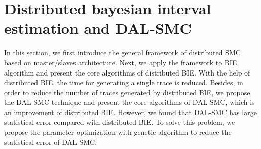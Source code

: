 \section{Distributed bayesian interval estimation and DAL-SMC}
In this section, we first introduce the general framework of distributed SMC based on master/slaves architecture. Next, we apply the framework to BIE algorithm and present the core algorithms of distributed BIE. With the help of distributed BIE, the time for generating a single trace is reduced. Besides, in order to reduce the number of traces generated by distributed BIE, we propose the DAL-SMC technique and present the core algorithms of DAL-SMC, which is an improvement of distributed BIE. However, we found that DAL-SMC has large statistical error compared with distributed BIE. To solve this problem, we propose the parameter optimization with genetic algorithm to reduce the statistical error of DAL-SMC.
